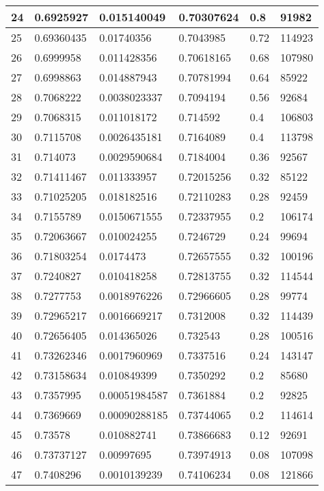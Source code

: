 \begin{longtable}{|l|l|l|l|l|l|}
24 & 0.6925927 & 0.015140049 & 0.70307624 & 0.8 & 91982 \\ \hline 
25 & 0.69360435 & 0.01740356 & 0.7043985 & 0.72 & 114923 \\ \hline 
26 & 0.6999958 & 0.011428356 & 0.70618165 & 0.68 & 107980 \\ \hline 
27 & 0.6998863 & 0.014887943 & 0.70781994 & 0.64 & 85922 \\ \hline 
28 & 0.7068222 & 0.0038023337 & 0.7094194 & 0.56 & 92684 \\ \hline 
29 & 0.7068315 & 0.011018172 & 0.714592 & 0.4 & 106803 \\ \hline 
30 & 0.7115708 & 0.0026435181 & 0.7164089 & 0.4 & 113798 \\ \hline 
31 & 0.714073 & 0.0029590684 & 0.7184004 & 0.36 & 92567 \\ \hline 
32 & 0.71411467 & 0.011333957 & 0.72015256 & 0.32 & 85122 \\ \hline 
33 & 0.71025205 & 0.018182516 & 0.72110283 & 0.28 & 92459 \\ \hline 
34 & 0.7155789 & 0.0150671555 & 0.72337955 & 0.2 & 106174 \\ \hline 
35 & 0.72063667 & 0.010024255 & 0.7246729 & 0.24 & 99694 \\ \hline 
36 & 0.71803254 & 0.0174473 & 0.72657555 & 0.32 & 100196 \\ \hline 
37 & 0.7240827 & 0.010418258 & 0.72813755 & 0.32 & 114544 \\ \hline 
38 & 0.7277753 & 0.0018976226 & 0.72966605 & 0.28 & 99774 \\ \hline 
39 & 0.72965217 & 0.0016669217 & 0.7312008 & 0.32 & 114439 \\ \hline 
40 & 0.72656405 & 0.014365026 & 0.732543 & 0.28 & 100516 \\ \hline 
41 & 0.73262346 & 0.0017960969 & 0.7337516 & 0.24 & 143147 \\ \hline 
42 & 0.73158634 & 0.010849399 & 0.7350292 & 0.2 & 85680 \\ \hline 
43 & 0.7357995 & 0.00051984587 & 0.7361884 & 0.2 & 92825 \\ \hline 
44 & 0.7369669 & 0.00090288185 & 0.73744065 & 0.2 & 114614 \\ \hline 
45 & 0.73578 & 0.010882741 & 0.73866683 & 0.12 & 92691 \\ \hline 
46 & 0.73737127 & 0.00997695 & 0.73974913 & 0.08 & 107098 \\ \hline 
47 & 0.7408296 & 0.0010139239 & 0.74106234 & 0.08 & 121866 \\ \hline 

\end{longtable}
